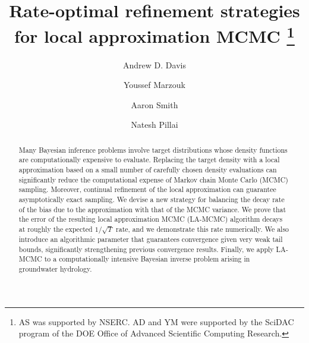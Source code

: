 \documentclass{svjour3}
\begin{document}
\title{Rate-optimal refinement strategies for local approximation MCMC
  \thanks{AS was supported by NSERC. AD and YM were supported by the SciDAC program of the DOE Office of Advanced Scientific Computing Research.}
}

\subtitle{}

\author{Andrew D. Davis \and Youssef Marzouk \and Aaron Smith \and Natesh Pillai}



\maketitle

\begin{abstract}
Many Bayesian inference problems involve target distributions whose density functions are computationally expensive to evaluate. Replacing the target density with a local approximation based on a small number of carefully chosen density evaluations can significantly reduce the computational expense of Markov chain Monte Carlo (MCMC) sampling. Moreover, continual refinement of the local approximation can guarantee asymptotically exact sampling. We devise a new strategy for balancing the decay rate of the bias due to the approximation with that of the MCMC variance. We prove that the error of the resulting local approximation MCMC (LA-MCMC) algorithm decays at roughly the expected $1/\sqrt{T}$ rate, and we demonstrate this rate numerically. We also introduce an algorithmic parameter that guarantees convergence given very weak tail bounds, significantly strengthening previous convergence results. Finally, we apply LA-MCMC to a computationally intensive Bayesian inverse problem arising in groundwater hydrology.

\end{abstract}
\end{document}
